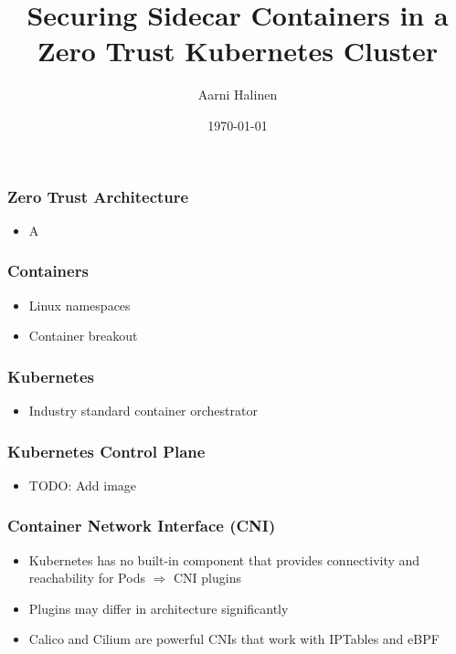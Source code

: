 \documentclass{beamer}
\title{Securing Sidecar Containers in a Zero Trust Kubernetes Cluster}
\author{Aarni Halinen}
\institute{
  Department of Computer Science\\
  Aalto University
}
\date{\today}
\begin{document}

\begin{frame}
\frametitle{Zero Trust Architecture}

\begin{itemize}
  \item A
\end{itemize}
\end{frame}

\begin{frame}
\frametitle{Containers}

\begin{itemize}
  \item Linux namespaces
  \item Container breakout
\end{itemize}
\end{frame}

\begin{frame}
\frametitle{Kubernetes}

\begin{itemize}
  \item Industry standard container orchestrator
\end{itemize}
\end{frame}

\begin{frame}
\frametitle{Kubernetes Control Plane}

\begin{itemize}
  \item TODO: Add image
\end{itemize}
\end{frame}

\begin{frame}
\frametitle{Container Network Interface (CNI)}

\begin{itemize}
  \item Kubernetes has no built-in component that provides connectivity and reachability for Pods $\Rightarrow$ CNI plugins
  \item Plugins may differ in architecture significantly
  \item Calico and Cilium are powerful CNIs that work with IPTables and eBPF
\end{itemize}
\end{frame}
\end{document}
